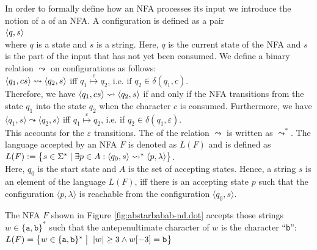 In order to formally define how an \textsc{NFA} processes its input we introduce the notion of a
  of an \textsc{NFA}.  A configuration
is defined as a pair
\\[0.2cm]
\hspace*{1.3cm}
$\pair(q, s)$
\\[0.2cm]
where  $q$ is a state and $s$ is a  string.  Here, $q$ is the current state of
the \textsc{NFA} and $s$ is the part of the input that has not yet been
consumed.  We define a binary relation
$\leadsto$ \index{$\leadsto$} on configurations as follows:
\\[0.2cm]
\hspace*{1.3cm}
$\pair(q_1, cs) \leadsto \pair(q_2, s)$ \quad iff \quad $q_1 \stackrel{c}{\mapsto} q_2$, \quad i.e. if $q_2 \in\delta(q_1, c)$.
\\[0.2cm]
Therefore, we have $\pair(q_1,cs) \leadsto \pair(q_2, s)$ if and only
if the \textsc{NFA} transitions from the state
$q_1$ into the state $q_2$ when the character $c$ is consumed.
Furthermore, we have
\\[0.2cm]
\hspace*{1.3cm}
$\langle q_1, s \rangle \leadsto \langle q_2, s \rangle$ \quad iff \quad $q_1 \stackrel{\varepsilon}{\mapsto}
q_2$, \quad i.e. if $q_2 \in \delta(q_1, \varepsilon)$.
\\[0.2cm]
This accounts for the $\varepsilon$ transitions.  The
 of the relation $\leadsto$ is written as $\leadsto^*$.
The language accepted by an \textsc{NFA} $F$ is
denoted as $L(F)$ and is defined as
\\[0.2cm]
\hspace*{1.3cm}
$L(F) := \bigl\{ s \in \Sigma^* \mid  
                 \exists p \in A : \pair(q_0,s) \leadsto^* \pair(p,\lambda) \bigr\}$.
\\[0.2cm]
Here,  $q_0$ is the  start state and $A$ is the set of accepting
states.  Hence, a string  $s$ is an element of the language  $L(F)$,  
iff there is an accepting state $p$ such that the configuration $\langle p, \lambda \rangle$ is reachable from the configuration $\langle q_0, s \rangle$.

\exampleEng 
The \textsc{NFA} $F$ shown in Figure \ref{fig:abstarbabab-nd.dot} accepts
those strings $w \in \{ \mathtt{a}, \mathtt{b} \}^*$ such that the
antepenultimate character of $w$ is  the character ``\texttt{b}'':
\\[0.2cm]
\hspace*{1.3cm}
$L(F) = \bigl\{ w \in \{ \mathtt{a}, \mathtt{b} \}^* \bigm|\; |w| \geq 3 \wedge w[-3] = \mathtt{b} \bigr\}$
 \eox
\vspace*{0.3cm}

